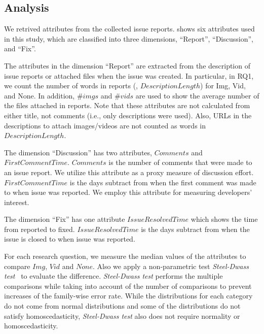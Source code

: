 \subsection{Analysis}
We retrived attributes from the collected issue reports.  shows six attributes used in this study, which are classified into three dimensions, ``Report'', ``Discussion'', and ``Fix''. 

The attributes in the dimension ``Report'' are extracted from the description of issue reports or attached files when the issue was created. 
In particular, in RQ1, we count the number of words in reports (\ie, $DescriptionLength$) for Img, Vid, and None. In addition,  $\#imgs$ and $\#vids$ are used to show the average number of the files attached in reports. 
Note that these attributes are not calculated from either title, not comments (i.e., only descriptions were used). Also, URLs in the descriptions to attach images/videos are not counted as words in $DescriptionLength$.

The dimension ``Discussion'' has two attributes, $Comments$ and $FirstCommentTime$. 
$Comments$ is the number of comments that were made to an issue report. 
We utilize this attribute as a proxy measure of discussion effort. $FirstCommentTime$ is the days subtract from when the first comment was made to when issue was reported. We employ this attribute for measuring developers' interest. 

The dimension ``Fix'' has one attribute $IssueResolvedTime$ which shows the time from reported to fixed. $IssueResolvedTime$ is the days subtract from when the issue is closed to when issue was reported.


For each research question, we measure the median values of the attributes to compare $Img$, $Vid$ and $None$. 
Also we apply a non-parametric test \textit{Steel-Dwass test}~\citep{steel-dwass-test} to evaluate the difference. 
\textit{Steel-Dwass test} performs the multiple comparisons while taking into account of the number of comparisons to prevent increases of the family-wise error rate. 
While the distributions for each category do not come from normal distributions and some of the distributions do not satisfy homoscedasticity, \textit{Steel-Dwass test} also does not require normality or homoscedasticity. 

